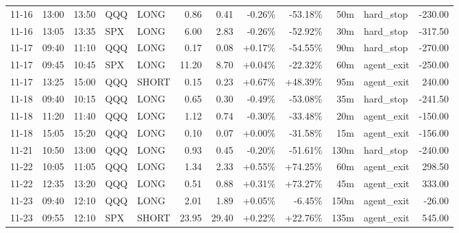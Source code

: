 \documentclass[11pt,a4paper,twoside]{article}
\begin{document}
\begin{center}
\begin{longtable}{>{\color{txtmain}}l l l l l r r r r r >{\color{txtmain}}l r}
11-16 & 13:00 & 13:50 & QQQ & LONG & 0.86 & 0.41 & \textcolor{lossred}{-0.26\%} & \textcolor{lossred}{-53.18\%} & 50m & hard\_stop & \textcolor{lossred}{-230.00} \\
11-16 & 13:05 & 13:35 & SPX & LONG & 6.00 & 2.83 & \textcolor{lossred}{-0.26\%} & \textcolor{lossred}{-52.92\%} & 30m & hard\_stop & \textcolor{lossred}{-317.50} \\
11-17 & 09:40 & 11:10 & QQQ & LONG & 0.17 & 0.08 & \textcolor{wingreen}{+0.17\%} & \textcolor{lossred}{-54.55\%} & 90m & hard\_stop & \textcolor{lossred}{-270.00} \\
11-17 & 09:45 & 10:45 & SPX & LONG & 11.20 & 8.70 & \textcolor{wingreen}{+0.04\%} & \textcolor{lossred}{-22.32\%} & 60m & agent\_exit & \textcolor{lossred}{-250.00} \\
11-17 & 13:25 & 15:00 & QQQ & SHORT & 0.15 & 0.23 & \textcolor{wingreen}{+0.67\%} & \textcolor{wingreen}{+48.39\%} & 95m & agent\_exit & \textcolor{wingreen}{240.00} \\
11-18 & 09:40 & 10:15 & QQQ & LONG & 0.65 & 0.30 & \textcolor{lossred}{-0.49\%} & \textcolor{lossred}{-53.08\%} & 35m & hard\_stop & \textcolor{lossred}{-241.50} \\
11-18 & 11:20 & 11:40 & QQQ & LONG & 1.12 & 0.74 & \textcolor{lossred}{-0.30\%} & \textcolor{lossred}{-33.48\%} & 20m & agent\_exit & \textcolor{lossred}{-150.00} \\
11-18 & 15:05 & 15:20 & QQQ & LONG & 0.10 & 0.07 & \textcolor{wingreen}{+0.00\%} & \textcolor{lossred}{-31.58\%} & 15m & agent\_exit & \textcolor{lossred}{-156.00} \\
11-21 & 10:50 & 13:00 & QQQ & LONG & 0.93 & 0.45 & \textcolor{lossred}{-0.20\%} & \textcolor{lossred}{-51.61\%} & 130m & hard\_stop & \textcolor{lossred}{-240.00} \\
11-22 & 10:05 & 11:05 & QQQ & LONG & 1.34 & 2.33 & \textcolor{wingreen}{+0.55\%} & \textcolor{wingreen}{+74.25\%} & 60m & agent\_exit & \textcolor{wingreen}{298.50} \\
11-22 & 12:35 & 13:20 & QQQ & LONG & 0.51 & 0.88 & \textcolor{wingreen}{+0.31\%} & \textcolor{wingreen}{+73.27\%} & 45m & agent\_exit & \textcolor{wingreen}{333.00} \\
11-23 & 09:40 & 12:10 & QQQ & LONG & 2.01 & 1.89 & \textcolor{wingreen}{+0.05\%} & \textcolor{lossred}{-6.45\%} & 150m & agent\_exit & \textcolor{lossred}{-26.00} \\
11-23 & 09:55 & 12:10 & SPX & SHORT & 23.95 & 29.40 & \textcolor{wingreen}{+0.22\%} & \textcolor{wingreen}{+22.76\%} & 135m & agent\_exit & \textcolor{wingreen}{545.00} \\

\end{longtable}
\end{center}
\end{document}
